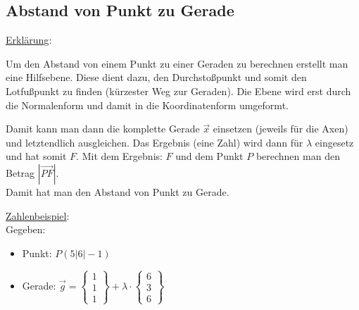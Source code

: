 \subsection{Abstand von Punkt zu Gerade}
\underline{Erklärung}: 

Um den Abstand von einem Punkt zu einer Geraden zu berechnen erstellt man eine Hilfsebene.
Diese dient dazu, den Durchstoßpunkt und somit den Lotfußpunkt zu finden (kürzester Weg zur Geraden). 
Die Ebene wird erst durch die Normalenform und damit in die Koordinatenform umgeformt. 

Damit kann man dann die komplette Gerade $\vec{x}$ einsetzen 
(jeweils für die Axen) und letztendlich ausgleichen. 
Das Ergebnis (eine Zahl) wird dann für $\lambda$ eingesetz und hat somit $F$.
Mit dem Ergebnis: $F$ und dem Punkt $P$ berechnen man den Betrag $|\overrightarrow{PF}|$. \\
Damit hat man den Abstand von Punkt zu Gerade.

\underline{Zahlenbeispiel}: \\
Gegeben: 
\begin{itemize}
    \item Punkt: $P(5|6|-1)$
    \item Gerade: $
        \vec{g} = 
        \begin{Bmatrix}
            1 \\ 1 \\ 1
        \end{Bmatrix}
        + \lambda \cdot
        \begin{Bmatrix}
            6 \\ 3 \\ 6
        \end{Bmatrix}
        $
\end{itemize}


